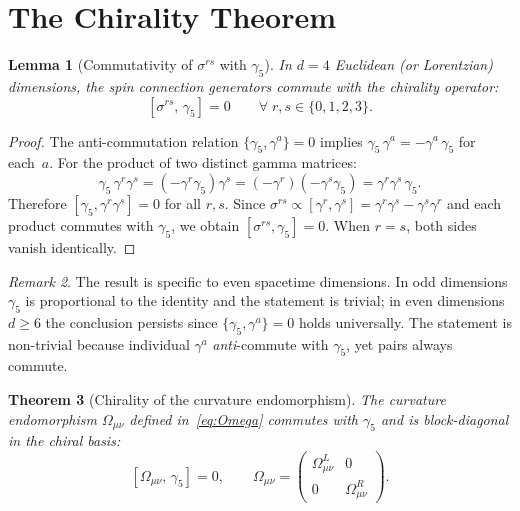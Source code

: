 \documentclass[12pt,a4paper]{article}
\newtheorem{theorem}{Theorem}[section]
\newtheorem{lemma}[theorem]{Lemma}
\theoremstyle{definition}
\theoremstyle{remark}
\newtheorem{remark}[theorem]{Remark}
\begin{document}
\section{The Chirality Theorem}
\label{sec:chirality}

\begin{lemma}[Commutativity of $\sigma^{rs}$ with $\gamma_5$]
\label{lem:sigma-g5}
In $d = 4$ Euclidean (or Lorentzian) dimensions, the spin connection
generators commute with the chirality operator:
\begin{equation}\label{eq:sigma-g5}
  [\sigma^{rs},\, \gamma_5] = 0 \qquad \forall\; r, s \in \{0,1,2,3\}.
\end{equation}
\end{lemma}

\begin{proof}
The anti-commutation relation $\{\gamma_5, \gamma^a\} = 0$ implies
$\gamma_5\,\gamma^a = -\gamma^a\,\gamma_5$ for each~$a$.
For the product of two distinct gamma matrices:
\begin{equation}
  \gamma_5\,\gamma^r\gamma^s
  = (-\gamma^r\gamma_5)\gamma^s
  = (-\gamma^r)(-\gamma^s\gamma_5)
  = \gamma^r\gamma^s\,\gamma_5.
\end{equation}
Therefore $[\gamma_5, \gamma^r\gamma^s] = 0$ for all $r, s$.
Since $\sigma^{rs} \propto [\gamma^r, \gamma^s]
= \gamma^r\gamma^s - \gamma^s\gamma^r$ and each product commutes with
$\gamma_5$, we obtain $[\sigma^{rs}, \gamma_5] = 0$.
When $r = s$, both sides vanish identically.
\end{proof}

\begin{remark}
The result is specific to even spacetime dimensions.  In odd dimensions
$\gamma_5$ is proportional to the identity and the statement is trivial;
in even dimensions $d \geq 6$ the conclusion persists since
$\{\gamma_5, \gamma^a\} = 0$ holds universally.  The statement is
non-trivial because individual $\gamma^a$ \emph{anti}-commute with
$\gamma_5$, yet pairs always commute.
\end{remark}

\begin{theorem}[Chirality of the curvature endomorphism]
\label{thm:chirality}
The curvature endomorphism $\Omega_{\mu\nu}$ defined in~\eqref{eq:Omega}
commutes with $\gamma_5$ and is block-diagonal in the chiral basis:
\begin{equation}\label{eq:Omega-blockdiag}
  [\Omega_{\mu\nu},\, \gamma_5] = 0, \qquad
  \Omega_{\mu\nu} = \begin{pmatrix}
    \Omega^L_{\mu\nu} & 0 \\ 0 & \Omega^R_{\mu\nu}
  \end{pmatrix}.
\end{equation}
\end{theorem}
\end{document}
